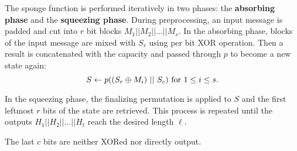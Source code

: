 The sponge function is performed iteratively in two phases: the \textbf{absorbing phase} and the \textbf{squeezing phase}. During preprocessing, an input message is padded and cut into $r$ bit blocks $M_1||M_2||\ldots||M_s$. In the absorbing phase, blocks of the input message are mixed with $S_r$ using per bit XOR operation. Then a result is concatenated with the capacity and passed through $p$ to become a new state again:
\begin{equation}
    S \leftarrow p((S_r \oplus M_i)~||~S_c)~\text{for}~1 \leq i \leq s. \notag
\end{equation}


In the squeezing phase, the finalizing permutation is applied to $S$ and the first leftmost $r$ bits of the state are retrieved. This process is repeated until the outputs $H_1||H_2||\ldots||H_t$ reach the desired length $\ell$.

The last $c$ bits are neither XORed nor directly output. 